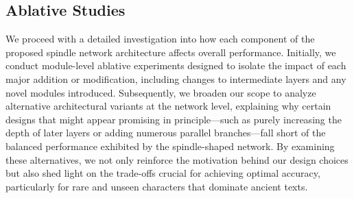 \subsection{Ablative Studies}
We proceed with a detailed investigation into how each component of the proposed spindle network architecture affects overall performance. Initially, we conduct module-level ablative experiments designed to isolate the impact of each major addition or modification, including changes to intermediate layers and any novel modules introduced. Subsequently, we broaden our scope to analyze alternative architectural variants at the network level, explaining why certain designs that might appear promising in principle—such as purely increasing the depth of later layers or adding numerous parallel branches—fall short of the balanced performance exhibited by the spindle-shaped network. By examining these alternatives, we not only reinforce the motivation behind our design choices but also shed light on the trade-offs crucial for achieving optimal accuracy, particularly for rare and unseen characters that dominate ancient texts.


%
%
%
%


